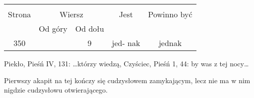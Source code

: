 \documentclass[a4paper,11pt]{article}
\begin{document}




\begin{center}

  \begin{tabular}{|c|c|c|c|c|}
    \hline
    & \multicolumn{2}{c|}{} & & \\
    Strona & \multicolumn{2}{c|}{Wiersz} & Jest
                              & Powinno być \\ \cline{2-3}
    & Od góry & Od dołu & & \\
    \hline
    350 & & 9 & jed- nak & jednak \\
    \hline
  \end{tabular}

\end{center}


Piekło, Pieśń IV, 131: \ldots którzy wiedzą, Czyściec, Pieśń 1, 44: by was
z tej nocy\ldots

\vspace{\spaceTwo}












\start {} Pierwszy akapit na tej kończy się cudzysłowem
zamykającym, lecz nie ma w nim nigdzie cudzysłowu otwierającego.

\vspace{\spaceFour}





\end{document}

